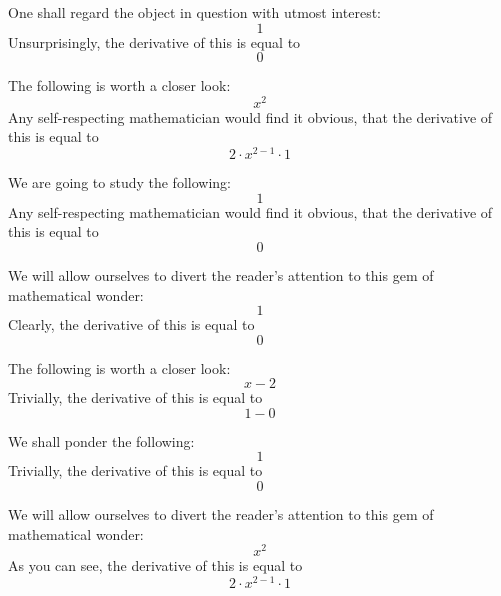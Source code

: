 \documentclass{article}
\begin{document}
One shall regard the object in question with utmost interest:
\begin{equation}
1 
\end{equation}
Unsurprisingly, the derivative of this is equal to
\begin{equation}
0 
\end{equation}

The following is worth a closer look:
\begin{equation}
x ^{2 } 
\end{equation}
Any self-respecting mathematician would find it obvious, that the derivative of this is equal to
\begin{equation}
2 \cdot x ^{2 - 1 } \cdot 1 
\end{equation}

We are going to study the following:
\begin{equation}
1 
\end{equation}
Any self-respecting mathematician would find it obvious, that the derivative of this is equal to
\begin{equation}
0 
\end{equation}

We will allow ourselves to divert the reader's attention to this gem of mathematical wonder:
\begin{equation}
1 
\end{equation}
Clearly, the derivative of this is equal to
\begin{equation}
0 
\end{equation}

The following is worth a closer look:
\begin{equation}
x - 2 
\end{equation}
Trivially, the derivative of this is equal to
\begin{equation}
1 - 0 
\end{equation}

We shall ponder the following:
\begin{equation}
1 
\end{equation}
Trivially, the derivative of this is equal to
\begin{equation}
0 
\end{equation}

We will allow ourselves to divert the reader's attention to this gem of mathematical wonder:
\begin{equation}
x ^{2 } 
\end{equation}
As you can see, the derivative of this is equal to
\begin{equation}
2 \cdot x ^{2 - 1 } \cdot 1 
\end{equation}
\end{document}
